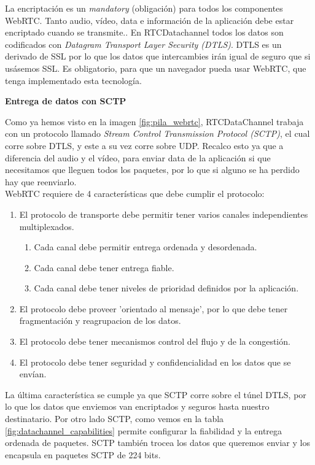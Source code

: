 La encriptación es un \textit{mandatory} (obligación) para todos los componentes WebRTC. Tanto audio, vídeo, data e información de la aplicación debe estar encriptado cuando se transmite.. En RTCDatachannel todos los datos son codificados con \textit{Datagram Transport Layer Security (DTLS)}. DTLS es un derivado de SSL por lo que los datos que intercambies irán igual de seguro que si usásemos SSL. Es obligatorio, para que un navegador pueda usar WebRTC, que tenga implementado esta tecnología.\\


\begin{normalsize}
\noindent \textbf{Entrega de datos con SCTP}\\
\end{normalsize}

Como ya hemos visto en la imagen \ref{fig:pila_webrtc}, RTCDataChannel trabaja con un protocolo llamado \textit{Stream Control Transmission Protocol (SCTP)}, el cual corre sobre DTLS, y este a su vez corre sobre UDP. Recalco esto ya que a diferencia del audio y el vídeo, para enviar data de la aplicación si que necesitamos que lleguen todos los paquetes, por lo que si alguno se ha perdido hay que reenviarlo.\\

\noindent WebRTC requiere de 4 características que debe cumplir el protocolo:

\begin{enumerate}
\item El protocolo de transporte debe permitir tener varios canales independientes multiplexados.
\begin{enumerate}
\item Cada canal debe permitir entrega ordenada y desordenada.
\item Cada canal debe tener entrega fiable.
\item Cada canal debe tener niveles de prioridad definidos por la aplicación.
\end{enumerate}
\item El protocolo debe proveer 'orientado al mensaje', por lo que debe tener fragmentación y reagrupacion de los datos.
\item El protocolo debe tener mecanismos control del flujo y de la congestión.
\item El protocolo debe tener seguridad y confidencialidad en los datos que se envían.
\end{enumerate}

La última característica se cumple ya que SCTP corre sobre el túnel DTLS, por lo que los datos que enviemos van encriptados y seguros hasta nuestro destinatario. Por otro lado SCTP, como vemos en la tabla \ref{fig:datachannel_capabilities} permite configurar la fiabilidad y la entrega ordenada de paquetes. SCTP también trocea los datos que queremos enviar y los encapsula en paquetes SCTP de 224 bits.\\


